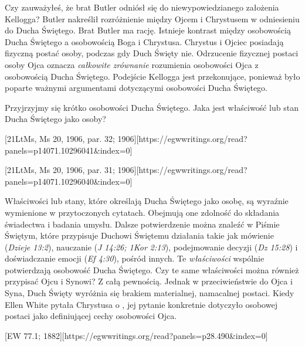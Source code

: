 Czy zauważyłeś, że brat Butler odniósł się do niewypowiedzianego założenia Kellogga? Butler nakreślił rozróżnienie między Ojcem i Chrystusem w odniesieniu do Ducha Świętego. Brat Butler ma rację. Istnieje kontrast między osobowością Ducha Świętego a osobowością Boga i Chrystusa. Chrystus i Ojciec posiadają fizyczną postać osoby, podczas gdy Duch Święty nie. Odrzucenie fizycznej postaci osoby Ojca oznacza \textit{całkowite zrównanie} rozumienia osobowości Ojca z osobowością Ducha Świętego. Podejście Kellogga jest przekonujące, ponieważ było poparte ważnymi argumentami dotyczącymi osobowości Ducha Świętego.

Przyjrzyjmy się krótko osobowości Ducha Świętego. Jaka jest właściwość lub stan Ducha Świętego jako osoby?

[21LtMs, Ms 20, 1906, par. 32; 1906][https://egwwritings.org/read?panels=p14071.10296041&index=0]

[21LtMs, Ms 20, 1906, par. 31; 1906][https://egwwritings.org/read?panels=p14071.10296040&index=0]

Właściwości lub stany, które określają Ducha Świętego jako osobę, są wyraźnie wymienione w przytoczonych cytatach. Obejmują one zdolność do składania świadectwa i badania umysłu. Dalsze potwierdzenie można znaleźć w Piśmie Świętym, które przypisuje Duchowi Świętemu działania takie jak mówienie (\textit{Dzieje 13:2}), nauczanie (\textit{J 14:26; 1Kor 2:13}), podejmowanie decyzji (\textit{Dz 15:28}) i doświadczanie emocji (\textit{Ef 4:30}), pośród innych. Te \textit{właściwości} wspólnie potwierdzają osobowość Ducha Świętego. Czy te same właściwości można również przypisać Ojcu i Synowi? Z całą pewnością. Jednak w przeciwieństwie do Ojca i Syna, Duch Święty wyróżnia się brakiem materialnej, namacalnej postaci. Kiedy Ellen White pytała Chrystusa o , jej pytanie konkretnie dotyczyło osobowej postaci jako definiującej cechy osobowości Ojca.

[EW 77.1; 1882][https://egwwritings.org/read?panels=p28.490&index=0]

